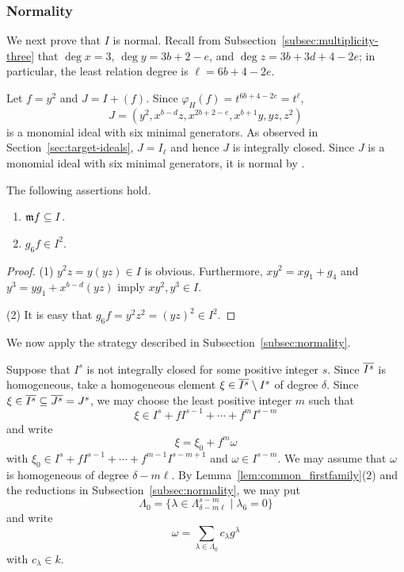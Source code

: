 \subsubsection{Normality}

We next prove that $I$ is normal.
Recall from Subsection~\ref{subsec:multiplicity-three} that
$\deg x=3$, $\deg y=3b+2-e$, and $\deg z=3b+3d+4-2e$; in particular,
the least relation degree is $\ell=6b+4-2e$.

Let $f=y^2$ and $J=I+(f)$. Since $\varphi_H(f) = t^{6b+4-2e} = t^\ell$, 
$$
J=(y^2, x^{b-d}z, x^{2b+2-e}, 	x^{b+1}y, yz, z^2)
$$
is a monomial ideal with six minimal generators.
As observed in Section~\ref{sec:target-ideals}, $J=I_\ell$ and hence $J$ is integrally closed.  Since $J$ is a monomial ideal with six minimal generators, it is normal by \cite{AtakaMatsuoka2026}.

\begin{lemma}\label{lem:common_firstfamily}
The following assertions hold.
\begin{enumerate}
	\item $\mathfrak m f \subseteq I$.
	\item $g_6 f \in I^2$.
\end{enumerate}
	
\end{lemma}

\begin{proof}
	(1) $y^2z = y(yz) \in I$ is obvious.
	Furthermore, $xy^2 = xg_1 + g_4$ and $y^3 = yg_1 + x^{b-d}(yz)$ imply $xy^2, y^3 \in I$.
	
	(2) It is easy that $g_6 f = y^2z^2 = (yz)^2 \in I^2$.
\end{proof}

We now apply the strategy described in Subsection~\ref{subsec:normality}.

Suppose that $I^s$ is not integrally closed for some positive integer $s$.
Since $\overline{I^s}$ is homogeneous, take a homogeneous element
$\xi\in\overline{I^s}\setminus I^s$ of degree $\delta$.  Since
$\xi\in\overline{I^s}\subseteq\overline{J^s}=J^s$, we may choose the least positive
integer $m$ such that
$$
\xi \in I^s + fI^{s-1} + \cdots + f^m I^{s-m}
$$
and write
$$
\xi = \xi_0 + f^m \omega
$$
with $\xi_0\in I^s+fI^{s-1}+\cdots+f^{m-1}I^{s-m+1}$ and
$\omega\in I^{s-m}$.  We may assume that $\omega$ is homogeneous of degree
$\delta-m\ell$.  By Lemma~\ref{lem:common_firstfamily}(2) and the reductions
in Subsection~\ref{subsec:normality}, we may put
$$
\Lambda_0=\{\lambda\in\Lambda^{s-m}_{\delta-m\ell}\mid\lambda_6=0\}
$$
and write
$$
\omega = \sum_{\lambda \in \Lambda_0} c_\lambda g^\lambda
$$
with $c_\lambda\in k$.



